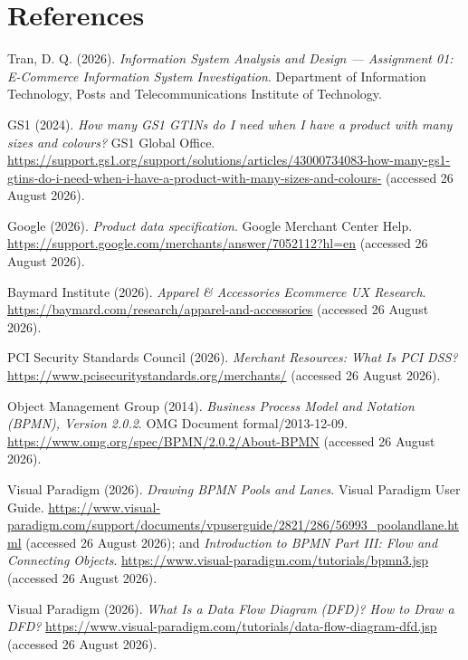 \documentclass[10pt,a4paper]{article}
\begin{document}
\section{References}
\sloppy
\begin{enumerate}[label={[R\arabic*]},leftmargin=8mm,itemsep=.3pt]
\footnotesize
\item Tran, D. Q. (2026). \emph{Information System Analysis and Design --- Assignment 01: E-Commerce Information System Investigation}. Department of Information Technology, Posts and Telecommunications Institute of Technology.
\item GS1 (2024). \emph{How many GS1 GTINs do I need when I have a product with many sizes and colours?} GS1 Global Office. \url{https://support.gs1.org/support/solutions/articles/43000734083-how-many-gs1-gtins-do-i-need-when-i-have-a-product-with-many-sizes-and-colours-} (accessed 26 August 2026).
\item Google (2026). \emph{Product data specification}. Google Merchant Center Help. \url{https://support.google.com/merchants/answer/7052112?hl=en} (accessed 26 August 2026).
\item Baymard Institute (2026). \emph{Apparel \& Accessories Ecommerce UX Research}. \url{https://baymard.com/research/apparel-and-accessories} (accessed 26 August 2026).
\item PCI Security Standards Council (2026). \emph{Merchant Resources: What Is PCI DSS?} \url{https://www.pcisecuritystandards.org/merchants/} (accessed 26 August 2026).
\item Object Management Group (2014). \emph{Business Process Model and Notation (BPMN), Version 2.0.2}. OMG Document formal/2013-12-09. \url{https://www.omg.org/spec/BPMN/2.0.2/About-BPMN} (accessed 26 August 2026).
\item Visual Paradigm (2026). \emph{Drawing BPMN Pools and Lanes}. Visual Paradigm User Guide. \url{https://www.visual-paradigm.com/support/documents/vpuserguide/2821/286/56993_poolandlane.html} (accessed 26 August 2026); and \emph{Introduction to BPMN Part III: Flow and Connecting Objects}. \url{https://www.visual-paradigm.com/tutorials/bpmn3.jsp} (accessed 26 August 2026).
\item Visual Paradigm (2026). \emph{What Is a Data Flow Diagram (DFD)? How to Draw a DFD?} \url{https://www.visual-paradigm.com/tutorials/data-flow-diagram-dfd.jsp} (accessed 26 August 2026).
\end{enumerate}
\end{document}
